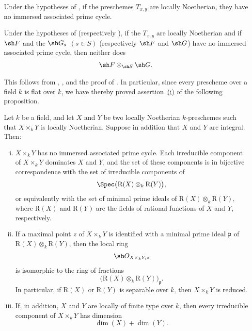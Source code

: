 \begin{corollary}[4.2.2]
\label{IV.4.2.2}
Under the hypotheses of , if the preschemes
$T_{x,y}$ are locally Noetherian, they have no immersed associated
prime cycle.
\end{corollary}

\begin{corollary}[4.2.3]
\label{IV.4.2.3}
Under the hypotheses of 
(respectively ), if the $T_{x,y}$ are locally Noetherian
and if $\sh F$ and the $\sh G_s$ $(s\in S)$
(respectively $\sh F$ and $\sh G$) have no immersed associated prime
cycle, then neither does
\[
\sh F\otimes_{\sh S}\sh G.
\]
\end{corollary}

This follows from , , and the proof of
.
In particular, since every prescheme over a field $k$ is flat over $k$,
we have thereby proved assertion~{\hyperref[IV.4.2.4.i]{(i)}} of the
following proposition.

\begin{proposition}[4.2.4]
\label{IV.4.2.4}
Let $k$ be a field, and let $X$ and $Y$ be two locally Noetherian
$k$-preschemes such that $X\times_k Y$ is locally Noetherian.
Suppose in addition that $X$ and $Y$ are integral.
Then:
\begin{enumerate}[(i)]
\item
{}
\label{IV.4.2.4.i}
$X\times_k Y$ has no immersed associated prime cycle.
Each irreducible component of $X\times_k Y$ dominates $X$ and $Y$, and
the set of these components is in bijective correspondence with the set
of irreducible components of
\[
\Spec\bigl(\mathrm R(X)\otimes_k\mathrm R(Y)\bigr),
\]
or equivalently with the set of minimal prime ideals of
$\mathrm R(X)\otimes_k\mathrm R(Y)$, where $\mathrm R(X)$ and
$\mathrm R(Y)$ are the fields of rational functions of $X$ and $Y$,
respectively.

\item
{}
\label{IV.4.2.4.ii}
If a maximal point $z$ of $X\times_k Y$ is identified with a minimal
prime ideal $\mathfrak p$ of
$\mathrm R(X)\otimes_k\mathrm R(Y)$, then the local ring
\[
\sh O_{X\times_k Y,z}
\]
is isomorphic to the ring of fractions
\[
\bigl(\mathrm R(X)\otimes_k\mathrm R(Y)\bigr)_{\mathfrak p}.
\]
In particular, if $\mathrm R(X)$ or $\mathrm R(Y)$ is separable over
$k$, then $X\times_k Y$ is reduced.


\item
{}
\label{IV.4.2.4.iii}
If, in addition, $X$ and $Y$ are locally of finite type over $k$, then
every irreducible component of $X\times_k Y$ has dimension
\[
\dim(X)+\dim(Y).
\]
\end{enumerate}
\end{proposition}


